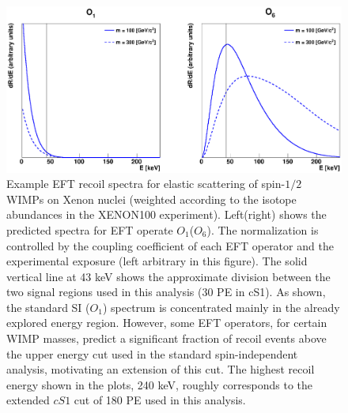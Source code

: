 \begin{figure}[h!]
\centerline{\includegraphics[width=1.\linewidth]{Figures/drdeO1O6.eps}}
\caption{Example EFT recoil spectra for elastic scattering of spin-$1/2$ WIMPs on Xenon nuclei (weighted according to the isotope abundances in the XENON100 experiment). Left(right) shows the predicted spectra for EFT operate $O_1$($O_6$). The normalization is controlled by the coupling coefficient of each EFT operator and the experimental exposure (left arbitrary in this figure). The solid vertical line at 43 keV shows the approximate division between the two signal regions used in this analysis (30 PE in cS1). As shown, the standard SI ($O_1$) spectrum is concentrated mainly in the already explored energy region. However, some EFT operators, for certain WIMP masses, predict a significant fraction of recoil events above the upper energy cut used in the standard spin-independent analysis, motivating an extension of this cut. The highest recoil energy shown in the plots, 240 keV, roughly corresponds to the extended $cS1$ cut of 180 PE used in this analysis.}
\label{fig:dRdE}
\end{figure}

